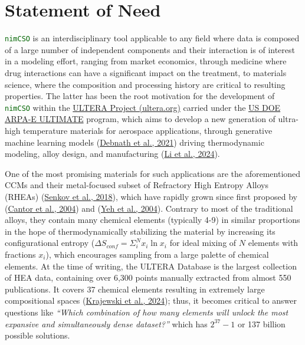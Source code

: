 \documentclass[
]{article}
\let\oldtexttt\texttt
\renewcommand{\texttt}[1]{\oldtexttt{\textcolor{darkgreen}{#1}}}
\begin{document}
\hypertarget{statement-of-need}{%
\section{Statement of Need}\label{statement-of-need}}

\texttt{nimCSO} is an interdisciplinary tool applicable to any field
where data is composed of a large number of independent components and
their interaction is of interest in a modeling effort, ranging from
market economics, through medicine where drug interactions can have a
significant impact on the treatment, to materials science, where the
composition and processing history are critical to resulting properties.
The latter has been the root motivation for the development of
\texttt{nimCSO} within the \href{https://ultera.org}{ULTERA Project
(ultera.org)} carried under the
\href{https://arpa-e.energy.gov/?q=arpa-e-programs/ultimate}{US DOE
ARPA-E ULTIMATE} program, which aims to develop a new generation of
ultra-high temperature materials for aerospace applications, through
generative machine learning models
(\protect\hyperlink{ref-Debnath2021}{Debnath et al., 2021}) driving
thermodynamic modeling, alloy design, and manufacturing
(\protect\hyperlink{ref-Li2024}{Li et al., 2024}).

One of the most promising materials for such applications are the
aforementioned CCMs and their metal-focused subset of Refractory High
Entropy Alloys (RHEAs) (\protect\hyperlink{ref-Senkov2018}{Senkov et
al., 2018}), which have rapidly grown since first proposed by
(\protect\hyperlink{ref-Cantor2004}{Cantor et al., 2004}) and
(\protect\hyperlink{ref-Yeh2004}{Yeh et al., 2004}). Contrary to most of
the traditional alloys, they contain many chemical elements (typically
4-9) in similar proportions in the hope of thermodynamically stabilizing
the material by increasing its configurational entropy
(\(\Delta S_{conf} = \Sigma_i^N x_i \ln{x_i}\) for ideal mixing of \(N\)
elements with fractions \(x_i\)), which encourages sampling from a large
palette of chemical elements. At the time of writing, the ULTERA
Database is the largest collection of HEA data, containing over 6,300
points manually extracted from almost 550 publications. It covers 37
chemical elements resulting in extremely large compositional spaces
(\protect\hyperlink{ref-Krajewski2024Nimplex}{Krajewski et al., 2024});
thus, it becomes critical to answer questions like \emph{``Which
combination of how many elements will unlock the most expansive and
simultaneously dense dataset?''} which has \(2^{37}-1\) or 137 billion
possible solutions.
\end{document}
